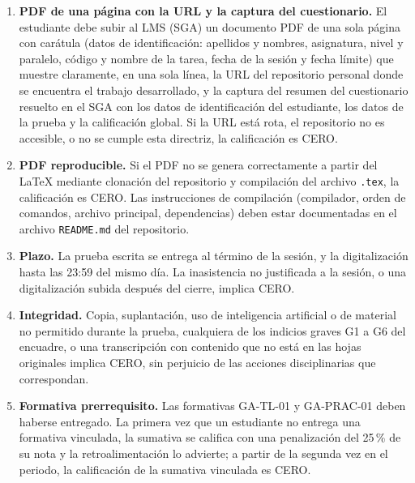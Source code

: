 \documentclass[11pt]{article}
\begin{document}
	\begin{cajapiso}[title={Criterios de piso: el incumplimiento de cualquiera implica calificación 0,0/10}]
		\begin{enumerate}[label=\textbf{P\arabic*.},leftmargin=24pt,itemsep=3pt]
			\item \textbf{PDF de una página con la URL y la captura del cuestionario.} El estudiante debe subir al LMS (SGA) un documento PDF de una sola página con carátula (datos de identificación: apellidos y nombres, asignatura, nivel y paralelo, código y nombre de la tarea, fecha de la sesión y fecha límite) que muestre claramente, en una sola línea, la URL del repositorio personal donde se encuentra el trabajo desarrollado, y la captura del resumen del cuestionario resuelto en el SGA con los datos de identificación del estudiante, los datos de la prueba y la calificación global. Si la URL está rota, el repositorio no es accesible, o no se cumple esta directriz, la calificación es CERO.
			\item \textbf{PDF reproducible.} Si el PDF no se genera correctamente a partir del \LaTeX{} mediante clonación del repositorio y compilación del archivo \texttt{.tex}, la calificación es CERO. Las instrucciones de compilación (compilador, orden de comandos, archivo principal, dependencias) deben estar documentadas en el archivo \texttt{README.md} del repositorio.
			\item \textbf{Plazo.} La prueba escrita se entrega al término de la sesión, y la digitalización hasta las 23:59 del mismo día. La inasistencia no justificada a la sesión, o una digitalización subida después del cierre, implica CERO.
			\item \textbf{Integridad.} Copia, suplantación, uso de inteligencia artificial o de material no permitido durante la prueba, cualquiera de los indicios graves G1 a G6 del encuadre, o una transcripción con contenido que no está en las hojas originales implica CERO, sin perjuicio de las acciones disciplinarias que correspondan.
			\item \textbf{Formativa prerrequisito.} Las formativas GA-TL-01 y GA-PRAC-01 deben haberse entregado. La primera vez que un estudiante no entrega una formativa vinculada, la sumativa se califica con una penalización del 25\,\% de su nota y la retroalimentación lo advierte; a partir de la segunda vez en el periodo, la calificación de la sumativa vinculada es CERO.
		\end{enumerate}
	\end{cajapiso}
	
\end{document}
